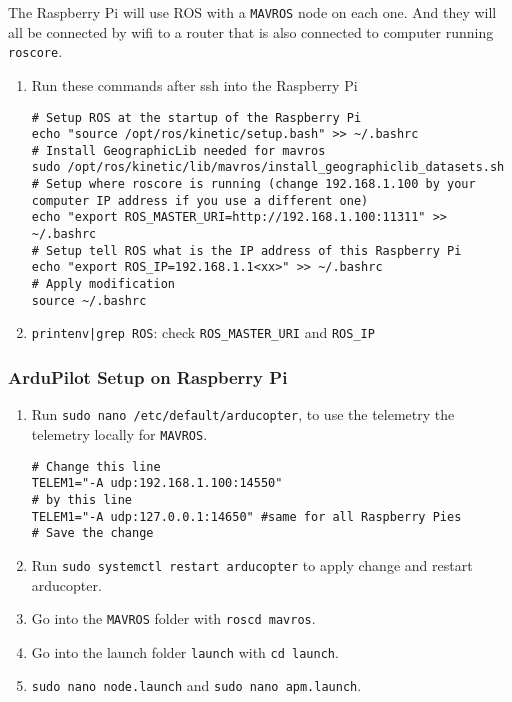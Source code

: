 The Raspberry Pi will use ROS with a \texttt{MAVROS} node on each one. And they will all be connected by wifi to a router that is also connected to computer running \texttt{roscore}.
\begin{enumerate}
    \item Run these commands after ssh into the Raspberry Pi

          \begin{verbatim}
# Setup ROS at the startup of the Raspberry Pi
echo "source /opt/ros/kinetic/setup.bash" >> ~/.bashrc
# Install GeographicLib needed for mavros
sudo /opt/ros/kinetic/lib/mavros/install_geographiclib_datasets.sh
# Setup where roscore is running (change 192.168.1.100 by your computer IP address if you use a different one)
echo "export ROS_MASTER_URI=http://192.168.1.100:11311" >> ~/.bashrc
# Setup tell ROS what is the IP address of this Raspberry Pi
echo "export ROS_IP=192.168.1.1<xx>" >> ~/.bashrc
# Apply modification
source ~/.bashrc
                    \end{verbatim}
    \item \texttt{printenv|grep ROS}: check \texttt{ROS\_MASTER\_URI} and \texttt{ROS\_IP}
\end{enumerate}

\subsubsection{ArduPilot Setup on Raspberry Pi}
\begin{enumerate}
    \item Run \texttt{sudo nano /etc/default/arducopter}, to use the telemetry the telemetry locally for \texttt{MAVROS}.

          \begin{verbatim}
# Change this line
TELEM1="-A udp:192.168.1.100:14550"
# by this line
TELEM1="-A udp:127.0.0.1:14650" #same for all Raspberry Pies
# Save the change
                    \end{verbatim}

    \item Run \texttt{sudo systemctl restart arducopter} to apply change and restart arducopter.
    \item Go into the \texttt{MAVROS} folder with \texttt{roscd mavros}.
    \item Go into the launch folder \texttt{launch} with \texttt{cd launch}.
    \item \texttt{sudo nano node.launch} and \texttt{sudo nano apm.launch}.
\end{enumerate}

